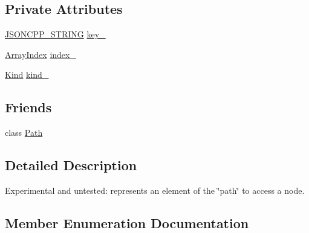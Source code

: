 \subsection*{Private Attributes}
\begin{DoxyCompactItemize}
\item 
\hyperlink{json_8hpp_a1e723f95759de062585bc4a8fd3fa4be}{J\+S\+O\+N\+C\+P\+P\+\_\+\+S\+T\+R\+I\+NG} \hyperlink{classJson_1_1PathArgument_af4024368548ff730ef2bed97d6f1ca43}{key\+\_\+}
\item 
\hyperlink{namespaceJson_a8048e741f2177c3b5d9ede4a5b8c53c2}{Array\+Index} \hyperlink{classJson_1_1PathArgument_afd5857d1b6bfaae6961333bdae7bd5ec}{index\+\_\+}
\item 
\hyperlink{classJson_1_1PathArgument_a2420bbad778573c147e578701b84d9b9}{Kind} \hyperlink{classJson_1_1PathArgument_ad4bc4b544b155a3d9c7788572ecf991b}{kind\+\_\+}
\end{DoxyCompactItemize}
\subsection*{Friends}
\begin{DoxyCompactItemize}
\item 
class \hyperlink{classJson_1_1PathArgument_a4877239a6b7f09fbf5a61ca68a49d74c}{Path}
\end{DoxyCompactItemize}


\subsection{Detailed Description}
Experimental and untested\+: represents an element of the \char`\"{}path\char`\"{} to access a node. 

\subsection{Member Enumeration Documentation}
